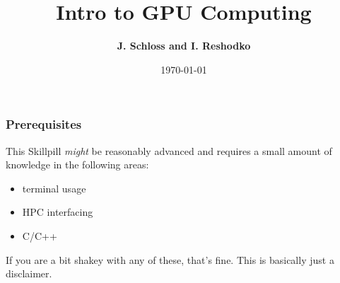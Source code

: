 \documentclass{beamer}
\title[Presentation Skills]{Intro to GPU Computing}
\author{\textbf{J. Schloss and I. Reshodko}} %
\institute[OIST] %
{
\textbf{james.schloss@oist.jp} %
}
\date{\today} %
\begin{document}
\begin{frame}
\vspace*{1.4cm}
\titlepage %
\end{frame}



\begin{frame}
\frametitle{Prerequisites}
This Skillpill \textit{might} be reasonably advanced and requires a small amount of knowledge in the following areas:
\begin{itemize}
\item terminal usage 
\item HPC interfacing
\item C/C++
\end{itemize}

If you are a bit shakey with any of these, that's fine. This is basically just a disclaimer.
\end{frame}
\end{document}
